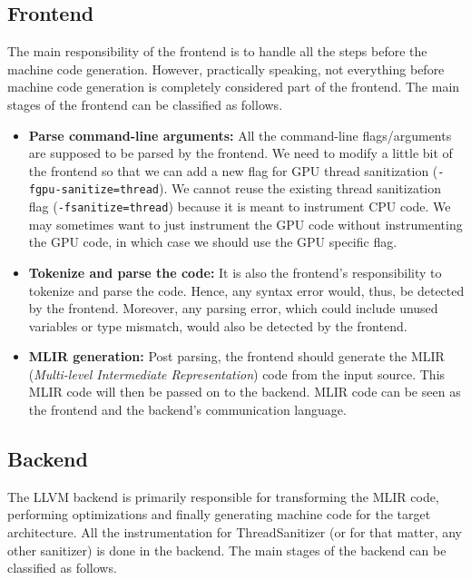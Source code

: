 \documentclass{btp}
\begin{document}
\subsection{Frontend}

The main responsibility of the frontend is to handle all the steps before the machine code generation. However, practically speaking, not everything before machine code generation is completely considered part of the frontend. The main stages of the frontend can be classified as follows.

\begin{itemize}
	\item \textbf{Parse command-line arguments:} All the command-line flags/arguments are supposed to be parsed by the frontend. We need to modify a little bit of the frontend so that we can add a new flag for GPU thread sanitization (\texttt{-fgpu-sanitize=thread}). We cannot reuse the existing thread sanitization flag (\texttt{-fsanitize=thread}) because it is meant to instrument CPU code. We may sometimes want to just instrument the GPU code without instrumenting the GPU code, in which case we should use the GPU specific flag.
	\item \textbf{Tokenize and parse the code:} It is also the frontend's responsibility to tokenize and parse the code. Hence, any syntax error would, thus, be detected by the frontend. Moreover, any parsing error, which could include unused variables or type mismatch, would also be detected by the frontend.
	\item \textbf{MLIR generation:} Post parsing, the frontend should generate the MLIR \cite{mlir} (\textit{Multi-level Intermediate Representation}) code from the input source. This MLIR code will then be passed on to the backend. MLIR code can be seen as the frontend and the backend's communication language.
\end{itemize}

\subsection{Backend}

The LLVM backend is primarily responsible for transforming the MLIR code, performing optimizations and finally generating machine code for the target architecture. All the instrumentation for ThreadSanitizer (or for that matter, any other sanitizer) is done in the backend. The main stages of the backend can be classified as follows.
\end{document}
